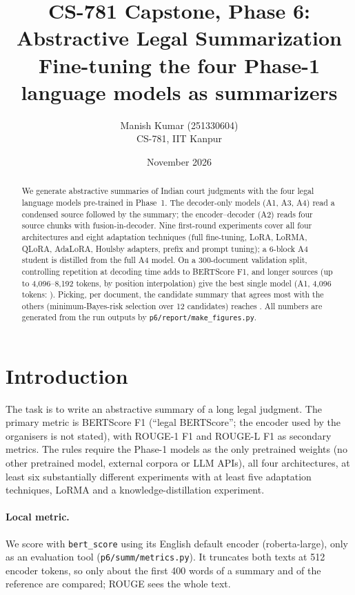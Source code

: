 \documentclass[11pt,a4paper]{article}
\title{\textbf{CS-781 Capstone, Phase 6: Abstractive Legal Summarization}\\[2pt]
\large Fine-tuning the four Phase-1 language models as summarizers}
\author{Manish Kumar (251330604)\\ CS-781, IIT Kanpur}
\date{November 2026}
\newcommand{\code}[1]{\texttt{\small #1}}
\begin{document}
\maketitle

\begin{abstract}
\noindent We generate abstractive summaries of Indian court judgments with the four legal language models
pre-trained in Phase~1.  The decoder-only models (A1, A3, A4) read a condensed source followed by the summary;
the encoder--decoder (A2) reads four source chunks with fusion-in-decoder.  Nine first-round experiments cover
all four architectures and eight adaptation techniques (full fine-tuning, LoRA, LoRMA, QLoRA, AdaLoRA, Houlsby
adapters, prefix and prompt tuning); a 6-block A4 student is distilled from the full A4 model.  On a 300-document
validation split, controlling repetition at decoding time adds \rpgainmin{} to \rpgainmax{} BERTScore F1, and
longer sources (up to 4{,}096--8{,}192 tokens, by position interpolation) give the best single model
(A1, 4{,}096 tokens: \bsSsevenc).  Picking, per document, the candidate summary that agrees most with the
others (minimum-Bayes-risk selection over 12 candidates) reaches \bsmbrseven.  All numbers are generated from the
run outputs by \code{p6/report/make\_figures.py}.
\end{abstract}

\tableofcontents
\newpage

\section{Introduction}
The task is to write an abstractive summary of a long legal judgment.  The primary metric is BERTScore F1
(``legal BERTScore''; the encoder used by the organisers is not stated), with ROUGE-1 F1 and ROUGE-L F1 as
secondary metrics.  The rules require the Phase-1 models as the only pretrained weights (no other pretrained
model, external corpora or LLM APIs), all four architectures, at least six substantially different experiments
with at least five adaptation techniques, LoRMA and a knowledge-distillation experiment.

\paragraph{Local metric.} We score with \code{bert\_score} using its English default encoder (roberta-large),
only as an evaluation tool (\code{p6/summ/metrics.py}).  It truncates both texts at 512 encoder tokens, so only
about the first 400 words of a summary and of the reference are compared; ROUGE sees the whole text.
\end{document}
